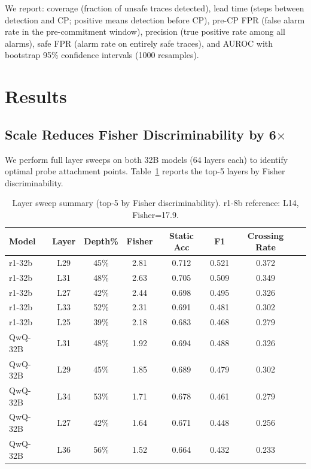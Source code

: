 \documentclass[11pt]{article}
\begin{document}
We report: coverage (fraction of unsafe traces detected), lead time (steps between detection and CP; positive means detection before CP), pre-CP FPR (false alarm rate in the pre-commitment window), precision (true positive rate among all alarms), safe FPR (alarm rate on entirely safe traces), and AUROC with bootstrap 95\% confidence intervals (1000 resamples).

\section{Results}

\subsection{Scale Reduces Fisher Discriminability by 6$\times$}

We perform full layer sweeps on both 32B models (64 layers each) to identify optimal probe attachment points. Table~\ref{tab:layer_sweep} reports the top-5 layers by Fisher discriminability.

\begin{table}[h]
\centering
\caption{Layer sweep summary (top-5 by Fisher discriminability). r1-8b reference: L14, Fisher=17.9.}
\label{tab:layer_sweep}
\small
\begin{tabular}{lccccccc}
\toprule
Model & Layer & Depth\% & Fisher & Static Acc & F1 & Crossing Rate \\
\midrule
r1-32b & L29 & 45\% & 2.81 & 0.712 & 0.521 & 0.372 \\
r1-32b & L31 & 48\% & 2.63 & 0.705 & 0.509 & 0.349 \\
r1-32b & L27 & 42\% & 2.44 & 0.698 & 0.495 & 0.326 \\
r1-32b & L33 & 52\% & 2.31 & 0.691 & 0.481 & 0.302 \\
r1-32b & L25 & 39\% & 2.18 & 0.683 & 0.468 & 0.279 \\
\midrule
QwQ-32B & L31 & 48\% & 1.92 & 0.694 & 0.488 & 0.326 \\
QwQ-32B & L29 & 45\% & 1.85 & 0.689 & 0.479 & 0.302 \\
QwQ-32B & L34 & 53\% & 1.71 & 0.678 & 0.461 & 0.279 \\
QwQ-32B & L27 & 42\% & 1.64 & 0.671 & 0.448 & 0.256 \\
QwQ-32B & L36 & 56\% & 1.52 & 0.664 & 0.432 & 0.233 \\
\bottomrule
\end{tabular}
\end{table}
\end{document}
